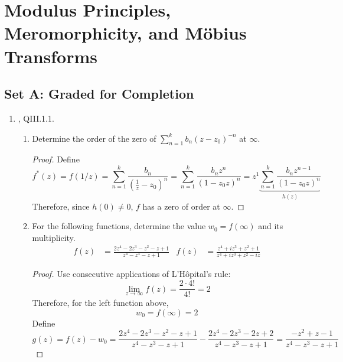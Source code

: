 \documentclass[../psets.tex]{subfiles}
\begin{document}
\section{Modulus Principles, Meromorphicity, and M\"{o}bius Transforms}
\subsection*{Set A: Graded for Completion}
\begin{enumerate}[ref={A.\arabic*}]
    \item {}\textcite{bib:FischerLieb}, QIII.1.1.
    \begin{enumerate}
        \item Determine the order of the zero of $\sum_{n=1}^kb_n(z-z_0)^{-n}$ at $\infty$.
        \begin{proof}
            Define
            \begin{equation*}
                f^*(z) = f(1/z)
                = \sum_{n=1}^k\frac{b_n}{(\tfrac{1}{z}-z_0)^n}
                = \sum_{n=1}^k\frac{b_nz^n}{(1-z_0z)^n}
                = z^1\underbrace{\sum_{n=1}^k\frac{b_nz^{n-1}}{(1-z_0z)^n}}_{h(z)}
            \end{equation*}
            Therefore, since $h(0)\neq 0$, $f$ has a zero of order  at $\infty$.
        \end{proof}
        \item For the following functions, determine the value $w_0=f(\infty)$ and its multiplicity.
        \begin{align*}
            f(z) &= \frac{2z^4-2z^3-z^2-z+1}{z^4-z^3-z+1}&
            f(z) &= \frac{z^4+iz^3+z^2+1}{z^4+iz^3+z^2-iz}
        \end{align*}
        \begin{proof}
            Use consecutive applications of L'H\^{o}pital's rule:
            \begin{equation*}
                \lim_{z\to\infty}f(z) = \frac{2\cdot 4!}{4!}
                = 2
            \end{equation*}
            Therefore, for the left function above,
            \begin{equation*}
                \boxed{w_0 = f(\infty) = 2}
            \end{equation*}
            Define
            \begin{equation*}
                g(z) = f(z)-w_0
                = \frac{2z^4-2z^3-z^2-z+1}{z^4-z^3-z+1}-\frac{2z^4-2z^3-2z+2}{z^4-z^3-z+1}
                = \frac{-z^2+z-1}{z^4-z^3-z+1}

\end{equation*}
\end{proof}
\end{enumerate}
\end{enumerate}
\end{document}
